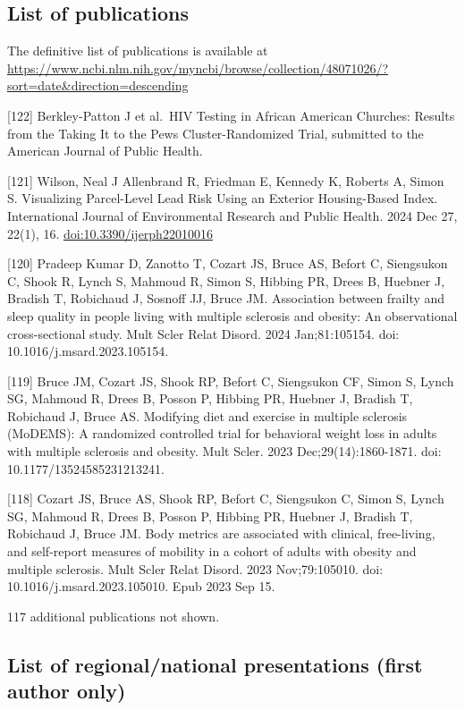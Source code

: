 \documentclass[
  12pt,
]{article}
\begin{document}
\subsection{List of publications}\label{list-of-publications}

The definitive list of publications is available at
\url{https://www.ncbi.nlm.nih.gov/myncbi/browse/collection/48071026/?sort=date&direction=descending}

{[}122{]} Berkley-Patton J et al.~HIV Testing in African American
Churches: Results from the Taking It to the Pews Cluster-Randomized
Trial, submitted to the American Journal of Public Health.

{[}121{]} Wilson, Neal J Allenbrand R, Friedman E, Kennedy K, Roberts A,
Simon S. Visualizing Parcel-Level Lead Risk Using an Exterior
Housing-Based Index. International Journal of Environmental Research and
Public Health. 2024 Dec 27, 22(1), 16. \url{doi:10.3390/ijerph22010016}

{[}120{]} Pradeep Kumar D, Zanotto T, Cozart JS, Bruce AS, Befort C,
Siengsukon C, Shook R, Lynch S, Mahmoud R, Simon S, Hibbing PR, Drees B,
Huebner J, Bradish T, Robichaud J, Sosnoff JJ, Bruce JM. Association
between frailty and sleep quality in people living with multiple
sclerosis and obesity: An observational cross-sectional study. Mult
Scler Relat Disord. 2024 Jan;81:105154. doi:
10.1016/j.msard.2023.105154.

{[}119{]} Bruce JM, Cozart JS, Shook RP, Befort C, Siengsukon CF, Simon
S, Lynch SG, Mahmoud R, Drees B, Posson P, Hibbing PR, Huebner J,
Bradish T, Robichaud J, Bruce AS. Modifying diet and exercise in
multiple sclerosis (MoDEMS): A randomized controlled trial for
behavioral weight loss in adults with multiple sclerosis and obesity.
Mult Scler. 2023 Dec;29(14):1860-1871. doi: 10.1177/13524585231213241.

{[}118{]} Cozart JS, Bruce AS, Shook RP, Befort C, Siengsukon C, Simon
S, Lynch SG, Mahmoud R, Drees B, Posson P, Hibbing PR, Huebner J,
Bradish T, Robichaud J, Bruce JM. Body metrics are associated with
clinical, free-living, and self-report measures of mobility in a cohort
of adults with obesity and multiple sclerosis. Mult Scler Relat Disord.
2023 Nov;79:105010. doi: 10.1016/j.msard.2023.105010. Epub 2023 Sep 15.

117 additional publications not shown.

\subsection{List of regional/national presentations (first author
only)}\label{list-of-regionalnational-presentations-first-author-only}
\end{document}
